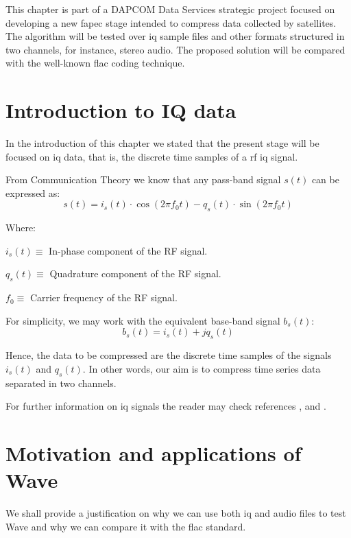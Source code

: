 This chapter is part of a DAPCOM Data Services strategic project focused on developing a new \acrshort{fapec} stage intended to compress data collected by satellites. The algorithm will be tested over \acrshort{iq} sample files and other formats structured in two channels, for instance, stereo audio. The proposed solution will be compared with the well-known \acrshort{flac} coding technique.

\section{Introduction to IQ data} \label{sec:iq_data}
In the introduction of this chapter we stated that the present stage will be focused on \acrshort{iq} data, that is, the discrete time samples of a \acrshort{rf} \acrshort{iq} signal.

From Communication Theory we know that any pass-band signal $s(t)$ can be expressed as:
\begin{equation}
s(t) = i_s(t) \cdot \cos(2\pi f_0 t) - q_s(t) \cdot \sin(2\pi f_0 t)
\end{equation}

Where:
\begin{description}
	\item $i_s(t) \equiv$ In-phase component of the RF signal.
	\item $q_s(t) \equiv$ Quadrature component of the RF signal.
	\item $f_0 \equiv$ Carrier frequency of the RF signal.
\end{description}

For simplicity, we may work with the equivalent base-band signal $b_s(t)$:
\begin{equation}
	b_s(t) = i_s(t) + j q_s(t)
\end{equation}

Hence, the data to be compressed are the discrete time samples of the signals $i_s(t)$ and $q_s(t)$. In other words, our aim is to compress time series data separated in two channels.

For further information on \acrshort{iq} signals the reader may check references \parencite{IQintro}, \parencite{carlson2010communication} and \parencite{ICOM}.

\section{Motivation and applications of Wave} \label{sec:wave_motivation}
We shall provide a justification on why we can use both \acrshort{iq} and audio files to test Wave and why we can compare it with the \acrshort{flac} standard.

